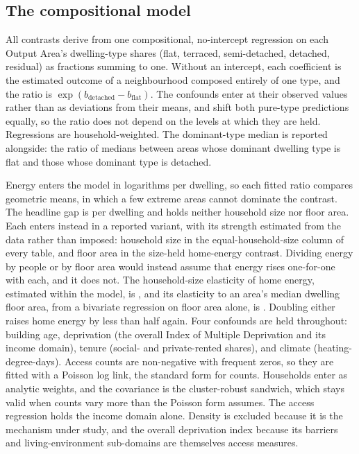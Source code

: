 \documentclass[pdflatex,sn-nature]{sn-jnl}
\begin{document}
\subsection*{The compositional model}

All contrasts derive from one compositional, no-intercept regression on each Output Area's dwelling-type shares (flat, terraced, semi-detached, detached, residual) as fractions summing to one. Without an intercept, each coefficient is the estimated outcome of a neighbourhood composed entirely of one type, and the ratio is $\exp(b_{\mathrm{detached}} - b_{\mathrm{flat}})$. The confounds enter at their observed values rather than as deviations from their means, and shift both pure-type predictions equally, so the ratio does not depend on the levels at which they are held. Regressions are household-weighted. The dominant-type median is reported alongside: the ratio of medians between areas whose dominant dwelling type is flat and those whose dominant type is detached.

Energy enters the model in logarithms per dwelling, so each fitted ratio compares geometric means, in which a few extreme areas cannot dominate the contrast. The headline gap is per dwelling and holds neither household size nor floor area. Each enters instead in a reported variant, with its strength estimated from the data rather than imposed: household size in the equal-household-size column of every table, and floor area in the size-held home-energy contrast. Dividing energy by people or by floor area would instead assume that energy rises one-for-one with each, and it does not. The household-size elasticity of home energy, estimated within the model, is \nepihhElast, and its elasticity to an area's median dwelling floor area, from a bivariate regression on floor area alone, is \nepifloorElast. Doubling either raises home energy by less than half again. Four confounds are held throughout: building age, deprivation (the overall Index of Multiple Deprivation and its income domain), tenure (social- and private-rented shares), and climate (heating-degree-days). Access counts are non-negative with frequent zeros, so they are fitted with a Poisson log link, the standard form for counts. Households enter as analytic weights, and the covariance is the cluster-robust sandwich, which stays valid when counts vary more than the Poisson form assumes. The access regression holds the income domain alone. Density is excluded because it is the mechanism under study, and the overall deprivation index because its barriers and living-environment sub-domains are themselves access measures.
\end{document}
